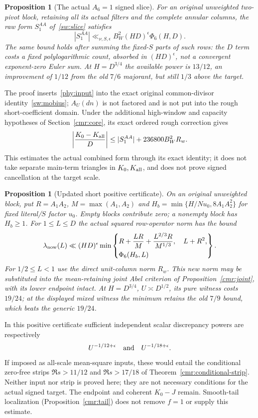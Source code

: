 \documentclass[11pt]{article}
\newtheorem{proposition}[theorem]{Proposition}
\theoremstyle{definition}\newtheorem{definition}[theorem]{Definition}
\theoremstyle{remark}\newtheorem{remark}[theorem]{Remark}
\begin{document}
\begin{proposition}[The actual $A_6=1$ signed slice]\label{phy:signed}
For an original unweighted two-pivot block, retaining all its actual
filters and the complete annular columns, the raw form
$S_1^{AA}$ of~\eqref{sw:slice} satisfies
\[
 |S_1^{AA}|\ll_{\nu,S,\epsilon}
       B_W^2(HD)^\epsilon\Phi_6(H,D).
\]
The same bound holds after summing the fixed-$S$ parts of such rows:
the $D$ term costs a fixed polylogarithmic count, absorbed in
$(HD)^\epsilon$, not a convergent exponent-zero Euler sum.
At $H=D^{3/4}$ the available power is $13/12$, an improvement of $1/12$
from the old $7/6$ majorant, but still $1/3$ above the target.
\end{proposition}
The proof inserts~\eqref{phy:input} into the exact original
common-divisor identity~\eqref{sw:mobius}; $A_U(dn)$ is not factored
and is not put into the rough short-coefficient domain.
Under the additional high-window and capacity hypotheses of
Section~\ref{cmr:core}, its exact ordered rough correction gives
\begin{equation}\label{phy:combined}
 \left|\frac{K_0-K_{\rm all}}D\right|
 \le |S_1^{AA}|+236800B_W^2R_w.
\end{equation}
This estimates the actual combined form through its exact identity;
it does not take separate main-term triangles in $K_0,K_{\rm all}$,
and does not prove signed cancellation at the target scale.

\begin{proposition}[Updated short positive certificate]\label{phy:short}
On an original unweighted block, put $R=A_1A_2$,
$M=\max(A_1,A_2)$ and
$H_b=\min\{H/Nu_0,8A_1A_2^2\}$ for fixed literal/$S$ factor $u_0$.
Empty blocks contribute zero; a nonempty block has $H_b\ge1$.
For $1\le L\le D$ the actual squared row-operator norm has the bound
\[
 \lambda_{\rm now}(L)\ll(HD)^\epsilon
 \min\left\{\begin{aligned}
 &R+\frac{LR}{M}+\frac{L^{2/3}R}{M^{1/3}},\quad L+R^2,\\
 &\Phi_6(H_b,L)
 \end{aligned}\right\}.
\]
For $1/2\le L<1$ use the direct unit-column norm $R_w$.
This new norm may be substituted into the mean-retaining joint
Abel criterion of Proposition~\ref{cmr:joint}, with its lower endpoint intact.
At $H=D^{3/4}$, $U\asymp D^{1/2}$, its pure witness costs $19/24$;
at the displayed mixed witness the minimum retains the old $7/9$
bound, which beats the generic $19/24$.
\end{proposition}
In this positive certificate sufficient independent scalar discrepancy
powers are respectively
\begin{equation}\label{phy:diagnostic}
 U^{-1/12+\epsilon}\quad\hbox{and}\quad U^{-1/18+\epsilon}.
\end{equation}
If imposed as all-scale mean-square inputs, these would entail the
conditional zero-free strips $\Re s>11/12$ and $\Re s>17/18$ of
Theorem~\ref{cmr:conditional-strip}. Neither input nor strip is proved
here; they are not necessary conditions for the actual signed target.
The endpoint and coherent $K_0-J$ remain. Smooth-tail localization
(Proposition~\ref{cmr:tail}) does not remove $f=1$ or supply this estimate.
\end{document}
